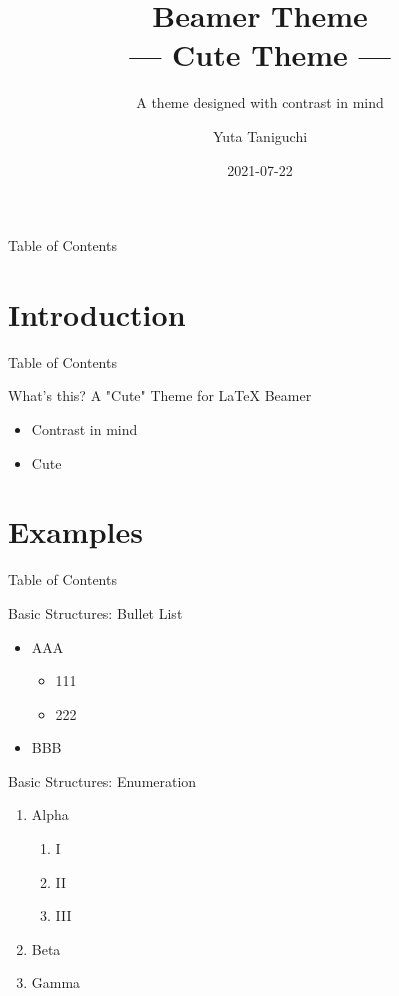 \documentclass[12pt,t,hyperref={pdfencoding=auto}]{beamer}
\title[Cute Theme]{Beamer Theme\\--- Cute Theme ---}
\subtitle{A theme designed with contrast in mind}
\author[Y.~Taniguchi]{Yuta Taniguchi}
\institute{@yuttieyuttie}
\date{2021-07-22}
\begin{document}
{
  \frame{\titlepage}
}
\setcounter{framenumber}{0}


\begin{frame}{Table of Contents}
  \toc
\end{frame}


\section{Introduction}
\begin{frame}{Table of Contents}
  \toc[currentsection]
\end{frame}


\begin{frame}{What's this?}
  \alert{A "Cute" Theme for LaTeX Beamer}
  \begin{itemize}
    \item Contrast in mind
    \item Cute
  \end{itemize}
\end{frame}


\section{Examples}
\begin{frame}{Table of Contents}
  \toc[currentsection]
\end{frame}


\begin{frame}{Basic Structures: Bullet List}
  \begin{itemize}
  \item AAA
    \begin{itemize}
    \item 111
    \item 222
    \end{itemize}
  \item BBB
  \end{itemize}
\end{frame}


\begin{frame}{Basic Structures: Enumeration}
  \begin{enumerate}
  \item Alpha
    \begin{enumerate}
    \item I
    \item II
    \item III
    \end{enumerate}
  \item Beta
  \item Gamma
  \end{enumerate}
\end{frame}
\end{document}
